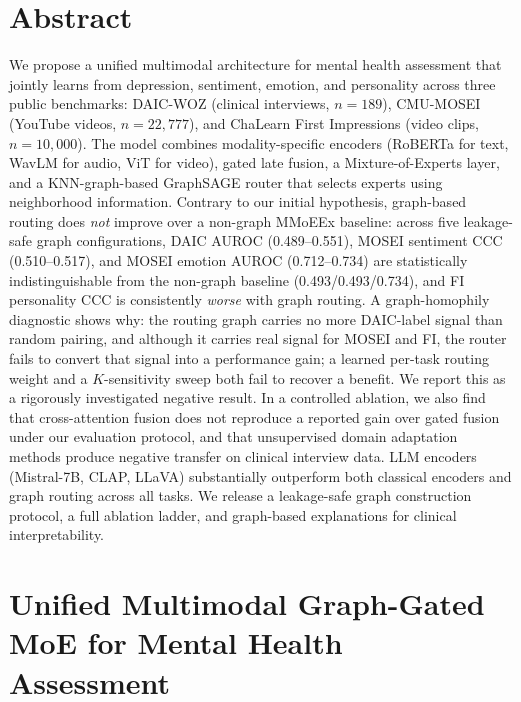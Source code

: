 \documentclass[12pt,oneside]{book}
\begin{document}
\chapter*{Abstract}

We propose a unified multimodal architecture for mental health assessment that jointly learns from depression, sentiment, emotion, and personality across three public benchmarks: DAIC-WOZ (clinical interviews, $n=189$), CMU-MOSEI (YouTube videos, $n=22{,}777$), and ChaLearn First Impressions (video clips, $n=10{,}000$). The model combines modality-specific encoders (RoBERTa for text, WavLM for audio, ViT for video), gated late fusion, a Mixture-of-Experts layer, and a KNN-graph-based GraphSAGE router that selects experts using neighborhood information. Contrary to our initial hypothesis, graph-based routing does \emph{not} improve over a non-graph MMoEEx baseline: across five leakage-safe graph configurations, DAIC AUROC (0.489--0.551), MOSEI sentiment CCC (0.510--0.517), and MOSEI emotion AUROC (0.712--0.734) are statistically indistinguishable from the non-graph baseline (0.493/0.493/0.734), and FI personality CCC is consistently \emph{worse} with graph routing. A graph-homophily diagnostic shows why: the routing graph carries no more DAIC-label signal than random pairing, and although it carries real signal for MOSEI and FI, the router fails to convert that signal into a performance gain; a learned per-task routing weight and a $K$-sensitivity sweep both fail to recover a benefit. We report this as a rigorously investigated negative result. In a controlled ablation, we also find that cross-attention fusion does not reproduce a reported gain over gated fusion under our evaluation protocol, and that unsupervised domain adaptation methods produce negative transfer on clinical interview data. LLM encoders (Mistral-7B, CLAP, LLaVA) substantially outperform both classical encoders and graph routing across all tasks. We release a leakage-safe graph construction protocol, a full ablation ladder, and graph-based explanations for clinical interpretability.

\chapter{Unified Multimodal Graph-Gated MoE for Mental Health Assessment}
\label{chap:unified_model}
\end{document}
